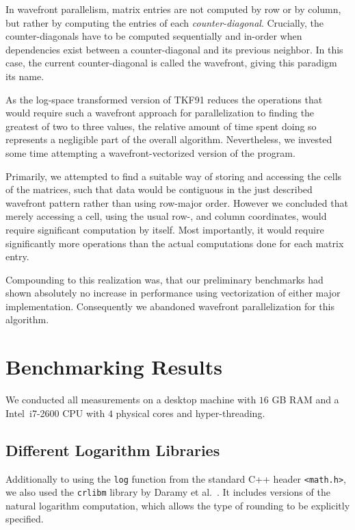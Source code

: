 \documentclass{article}
\begin{document}
In wavefront parallelism, matrix entries are not computed by row or by column, but rather by computing the entries of each \textit{counter-diagonal}. Crucially, the counter-diagonals have to be computed sequentially and in-order when dependencies exist between a counter-diagonal and its previous neighbor. In this case, the current counter-diagonal is called the wavefront, giving this paradigm its name.

As the log-space transformed version of TKF91 reduces the operations that would require such a wavefront approach for parallelization to finding the greatest of two to three values, the relative amount of time spent doing so represents a negligible part of the overall algorithm. Nevertheless, we invested some time attempting a wavefront-vectorized version of the program.

Primarily, we attempted to find a suitable way of storing and accessing the cells of the matrices, such that data would be contiguous in the just described wavefront pattern rather than using row-major order. However we concluded that merely accessing a cell, using the usual row-, and column coordinates, would require significant computation by itself. Most importantly, it would require significantly more operations than the actual computations done for each matrix entry.

Compounding to this realization was, that our preliminary benchmarks had shown absolutely no increase in performance using vectorization of either major implementation. Consequently we abandoned wavefront parallelization for this algorithm.

\section{Benchmarking Results}

We conducted all measurements on a desktop machine with $16$ GB RAM and
a Intel\texttrademark~i7-2600 CPU with $4$ physical cores and hyper-threading.

\subsection{Different Logarithm Libraries}
\label{sec:crlibm}

Additionally to using the \texttt{log} function from the standard C++ header \texttt{<math.h>}, we also used the \texttt{crlibm} library by Daramy et al.~\cite{Daramy04}. It includes versions of the natural logarithm computation, which allows the type of rounding to be explicitly specified.
\end{document}
